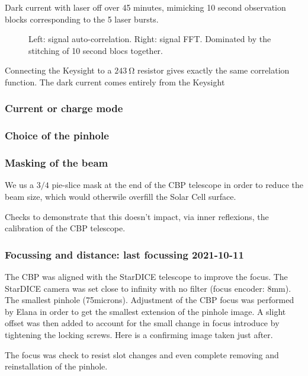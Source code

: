 \documentclass[onecolumn]{aa}
\begin{document}
Dark current with laser off over 45 minutes, mimicking 10 second observation
blocks corresponding to the 5 laser bursts.
\begin{figure}[!ht]
\begin{center}
\end{center}
\caption[]{Left: signal auto-correlation. Right: signal FFT. Dominated by the
  stitching of 10 second blocs together.}
\label{fig:darkcurrentspectrum}
\end{figure}

Connecting the Keysight to a $\SI{243}{\ohm}$ resistor gives exactly the same
correlation function. The dark current comes entirely from the Keysight


\subsubsection{Current or charge mode}

\subsubsection{Choice of the pinhole}

\subsubsection{Masking of the beam}
We us a $3/4$ pie-slice mask at the end of the CBP telescope in order to reduce
the beam size, which would otherwile overfill the Solar Cell surface.

Checks to demonstrate that this doesn't impact, via inner reflexions, the
calibration of the CBP telescope.

\subsubsection{Focussing and distance: last focussing 2021-10-11}
The CBP was aligned with the StarDICE telescope to improve the focus. The
StarDICE camera was set close to infinity with no filter (focus encoder:
8mm). The smallest pinhole (75microns). Adjustment of the CBP focus was
performed by Elana in order to get the smallest extension of the pinhole
image. A slight offset was then added to account for the small change in focus
introduce by tightening the locking screws. Here is a confirming image taken
just after.

The focus was check to resist slot changes and even complete removing and
reinstallation of the pinhole.
\end{document}
